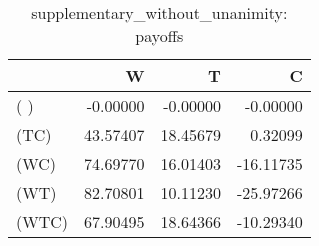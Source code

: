 \begin{table}
\centering
\caption{supplementary_without_unanimity: payoffs}
\begin{tabular}{lrrr}
\toprule
{} &        W &        T &         C \\
\midrule
( )   & -0.00000 & -0.00000 &  -0.00000 \\
(TC)  & 43.57407 & 18.45679 &   0.32099 \\
(WC)  & 74.69770 & 16.01403 & -16.11735 \\
(WT)  & 82.70801 & 10.11230 & -25.97266 \\
(WTC) & 67.90495 & 18.64366 & -10.29340 \\
\bottomrule
\end{tabular}
\end{table}
